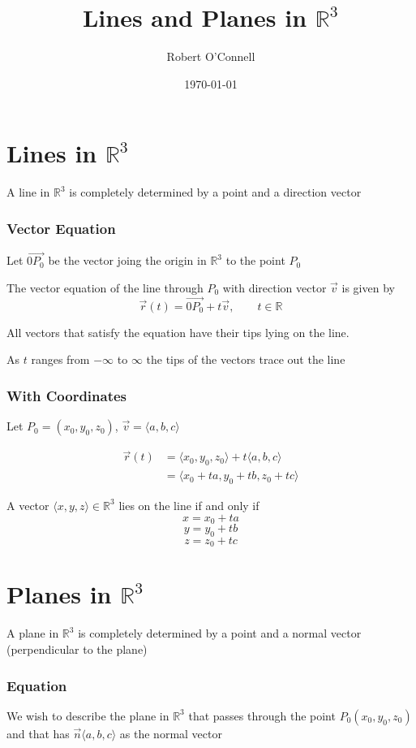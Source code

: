 \documentclass{article}
\title{\textbf{Lines and Planes in \(\mathbb{R}^3\)}}
\author{Robert O'Connell}
\date{\today}
\begin{document}
\maketitle
\vspace{5mm}
\section*{Lines in \(\mathbb{R}^3\)}
A line in \(\mathbb{R}^3\) is completely determined by a point and a direction vector

\subsubsection*{Vector Equation}
Let \(\overrightarrow{0P_0}\) be the vector joing the origin in \(\mathbb{R}^3\) to the point \(P_0\)

The vector equation of the line through \(P_0\) with direction vector \(\vec{v}\) is given by
\[
\vec{r}(t) = \overrightarrow{0P_0} + t\vec{v}, \quad  \quad t \in \mathbb{R}
\]

All vectors that satisfy the equation have their tips lying on the line.

As \(t\) ranges from \(-\infty\) to \(\infty\) the tips of the vectors trace out the line

\subsubsection*{With Coordinates}
Let \(P_0 = (x_0,y_0,z_0)\), \(\vec{v} = \langle a,b,c \rangle\)


\begin{align*}
    \vec{r}(t) &= \langle x_0,y_0,z_0 \rangle + t\langle a,b,c \rangle \\
    &= \langle x_0 + ta, y_0 + tb, z_0 +tc \rangle
\end{align*}

A vector \(\langle x,y,z \rangle \in \mathbb{R}^3\) lies on the line if and only if
\[
x = x_0  + ta 
\]
\[
y = y_0 + tb
\]
\[
z = z_0 + tc
\]

\section*{Planes in \(\mathbb{R}^3\)}
A plane in \(\mathbb{R}^3\) is completely determined by a point and a normal vector (perpendicular to the plane)

\subsubsection*{Equation}
We wish to describe the plane in \(\mathbb{R}^3\) that passes through the point \(P_0(x_0,y_0,z_0)\)
and that has \(\vec{n} \langle a,b,c \rangle\) as the normal vector
\end{document}
